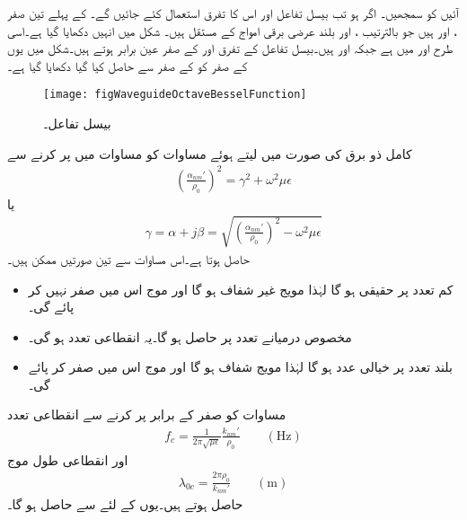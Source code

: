 آئیں  کو سمجھیں۔ اگر  ہو تب بیسل تفاعل  اور اس کا تفرق  استعمال کئے جائیں گے۔ کے  پہلے تین صفر ،  اور  ہیں جو بالترتیب  ،  اور   بلند عرضی برقی امواج کے مستقل ہیں۔ شکل  میں انہیں دکھایا گیا ہے۔اسی طرح  اور  میں  ہے  جبکہ  اور  ہیں۔بیسل تفاعل کے تفرق  اور  کے صفر عین برابر ہوتے ہیں۔شکل میں یوں  کے صفر کو  کے صفر سے حاصل کیا گیا دکھایا گیا ہے۔
\begin{figure}
\centering
\texttt{[image: figWaveguideOctaveBesselFunction]}
\caption{بیسل تفاعل۔}
\label{شکل_مویج_بیسل_تفاعل_الف}
\end{figure}

کامل ذو برق کی صورت میں  لیتے ہوئے مساوات  کو مساوات  میں پر کرنے سے
\begin{align*}
\left(\frac{\alpha_{nm}'}{\rho_0}\right)^2=\gamma^2+\omega^2 \mu \epsilon
\end{align*}
یا
\begin{align}\label{مساوات_مویج_ترسیلی_مستقل_ب}
\gamma=\alpha+j \beta=\sqrt{\left(\frac{\alpha_{nm}'}{\rho_0}\right)^2-\omega^2 \mu \epsilon}
\end{align}
حاصل ہوتا ہے۔اس مساوات سے تین صورتیں ممکن ہیں۔
\begin{itemize}
\item
کم تعدد پر حقیقی  ہو گا لہٰذا مویج غیر شفاف ہو گا اور موج اس میں صفر نہیں کر پائے گی۔
\item
مخصوص درمیانے تعدد پر  حاصل ہو گا۔یہ انقطاعی تعدد ہو گی۔
\item
بلند تعدد پر  خیالی عدد ہو گا لہٰذا مویج شفاف ہو گا اور موج اس میں صفر کر پائے گی۔
\end{itemize}

مساوات  کو صفر کے برابر پر کرنے سے انقطاعی تعدد
\begin{align}
f_c=\frac{1}{2\pi\sqrt{\mu \epsilon}} \frac{k_{nm}'}{\rho_0} \quad \quad (\si{\hertz})
\end{align}
اور انقطاعی طول موج
\begin{align}
\lambda_{0c}=\frac{2\pi \rho_0}{k_{nm}'} \quad \quad (\si{\meter})
\end{align}
حاصل ہوتے ہیں۔یوں  کے لئے  سے  حاصل ہو گا۔


